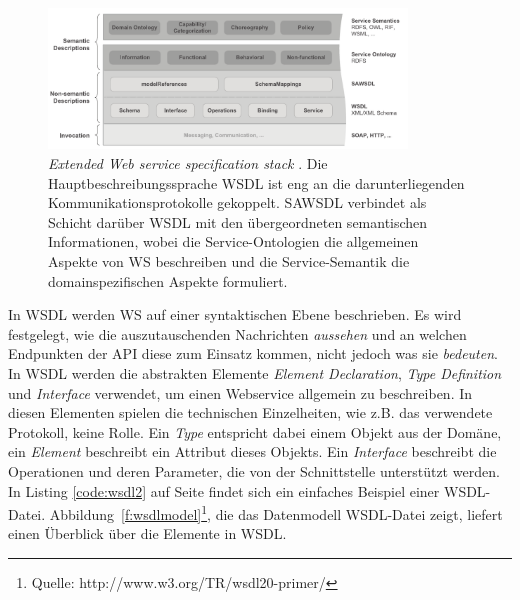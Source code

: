 \begin{figure}[ht]
\centering
\parbox{0.85\textwidth}{
    \includegraphics[width=0.85\textwidth]{media/Extended-Web-Service-Specification-Stack.pdf}
    \caption{\emph{Extended Web service specification stack} \cite[S.63]{ky-sawsdl}. Die Hauptbeschreibungssprache \ac{WSDL} ist eng an die darunterliegenden Kommunikationsprotokolle gekoppelt. \ac{SAWSDL} verbindet als Schicht darüber \ac{WSDL} mit den übergeordneten semantischen Informationen, wobei die Service-Ontologien die allgemeinen Aspekte von \acl{WS} beschreiben und die Service-Semantik die domainspezifischen Aspekte formuliert.}
    \label{f:ewsss}
}
\end{figure}

In \ac{WSDL} werden \acl{WS} auf einer syntaktischen Ebene beschrieben. Es wird festgelegt, wie die auszutauschenden Nachrichten \emph{aussehen} und an welchen Endpunkten der \ac{API} diese zum Einsatz kommen, nicht jedoch was sie \emph{bedeuten}. In \ac{WSDL} werden die abstrakten Elemente \emph{Element Declaration}, \emph{Type Definition} und \emph{Interface} verwendet, um einen Webservice allgemein zu beschreiben. In diesen Elementen spielen die technischen Einzelheiten, wie z.B. das verwendete Protokoll, keine Rolle. Ein \emph{Type} entspricht dabei einem Objekt aus der Domäne, ein \emph{Element} beschreibt ein Attribut dieses Objekts. Ein \emph{Interface} beschreibt die Operationen und deren Parameter, die von der Schnittstelle unterstützt werden. In Listing \ref{code:wsdl2} auf Seite \pageref{code:wsdl2} findet sich ein einfaches Beispiel einer \ac{WSDL}-Datei. Abbildung~\ref{f:wsdlmodel}\footnote{Quelle: http://www.w3.org/TR/wsdl20-primer/}, die das Datenmodell \ac{WSDL}-Datei zeigt, liefert einen Überblick über die Elemente in \ac{WSDL}.

